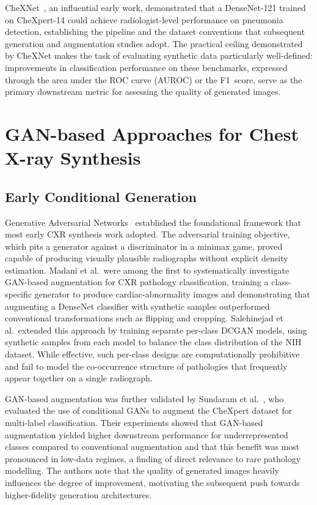 CheXNet~\cite{Rajpurkar2017}, an influential early work, demonstrated that a DenseNet-121
trained on CheXpert-14 could achieve radiologist-level performance on pneumonia detection,
establishing the pipeline and the dataset conventions that subsequent generation and
augmentation studies adopt. The practical ceiling demonstrated by CheXNet makes the task of
evaluating synthetic data particularly well-defined: improvements in classification performance
on these benchmarks, expressed through the area under the ROC curve (AUROC) or the
F1~score, serve as the primary downstream metric for assessing the quality of generated images.

\section{GAN-based Approaches for Chest X-ray Synthesis}
\label{sec:rw_gan_cxr}

\subsection{Early Conditional Generation}

Generative Adversarial Networks~\cite{Goodfellow2014} established the foundational framework
that most early CXR synthesis work adopted. The adversarial training objective, which pits a
generator against a discriminator in a minimax game, proved capable of producing
visually plausible radiographs without explicit density estimation. Madani et al.~were among the
first to systematically investigate GAN-based augmentation for CXR pathology classification,
training a class-specific generator to produce cardiac-abnormality images and demonstrating that
augmenting a DenseNet classifier with synthetic samples outperformed conventional
transformations such as flipping and cropping. Salehinejad et al.~extended this approach by
training separate per-class DCGAN models, using synthetic samples from each model to balance
the class distribution of the NIH dataset. While effective, such per-class designs are
computationally prohibitive and fail to model the co-occurrence structure of pathologies that
frequently appear together on a single radiograph.

GAN-based augmentation was further validated by Sundaram et al.~\cite{Sundaram2021}, who
evaluated the use of conditional GANs to augment the CheXpert dataset for multi-label
classification. Their experiments showed that GAN-based augmentation yielded higher downstream
performance for underrepresented classes compared to conventional augmentation and that this
benefit was most pronounced in low-data regimes, a finding of direct relevance to rare
pathology modelling. The authors note that the quality of generated images heavily influences
the degree of improvement, motivating the subsequent push towards higher-fidelity generation
architectures.


